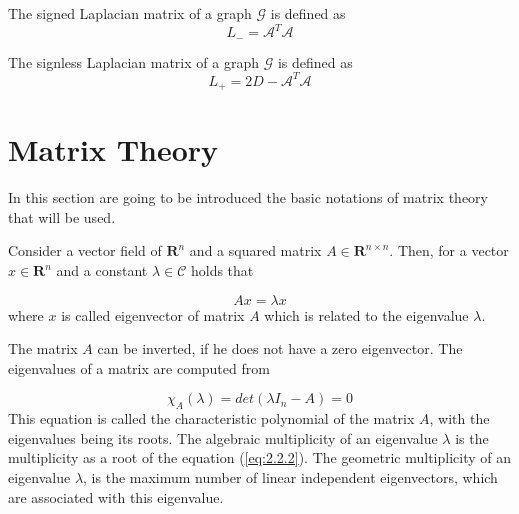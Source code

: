     \begin{definition}\label{def:2.11}
        \cite{hong2016decomposing} The signed Laplacian matrix of a graph $\mathcal{G}$ is defined as
        \begin{equation}\label{eq:2.1.3}
            L_- = \mathcal{A}^T\mathcal{A}
        \end{equation}
    \end{definition}
    
    \begin{definition}\label{def:2.12}
        \cite{hong2016decomposing} The signless Laplacian matrix of a graph $\mathcal{G}$ is defined as
        \begin{equation}\label{eq:2.1.4}
            L_+ = 2D - \mathcal{A}^T\mathcal{A}
        \end{equation}
    \end{definition}
    

\section{Matrix Theory}

    In this section are going to be introduced the basic notations of matrix theory that will be used.
    
    \begin{definition}\label{def:2.13}
        \cite{strang2006linear} Consider a vector field of $\mathbf{R}^n$ and a squared matrix $A \in \mathbf{R}^{n \times n}$. Then, for a vector $x \in \mathbf{R}^n$ and a constant $\lambda \in \mathcal{C}$ holds that
    
        \begin{equation}\label{eq:2.2.1}
            Ax = \lambda x
        \end{equation}
        where $x$ is called eigenvector of matrix $A$ which is related to the eigenvalue $\lambda$.
    \end{definition}
    The matrix $A$ can be inverted, if he does not have a zero eigenvector. The eigenvalues of a matrix are computed from
    
    \begin{equation}\label{eq:2.2.2}
        \chi_A(\lambda) = det(\lambda I_n - A) = 0
    \end{equation}
    This equation is called the characteristic polynomial of the matrix $A$, with the eigenvalues being its roots. The algebraic multiplicity of an eigenvalue $\lambda$ is the multiplicity as a root of the equation (\ref{eq:2.2.2}). The geometric multiplicity of an eigenvalue $\lambda$, is the maximum number of linear independent eigenvectors, which are associated with this eigenvalue.
    
